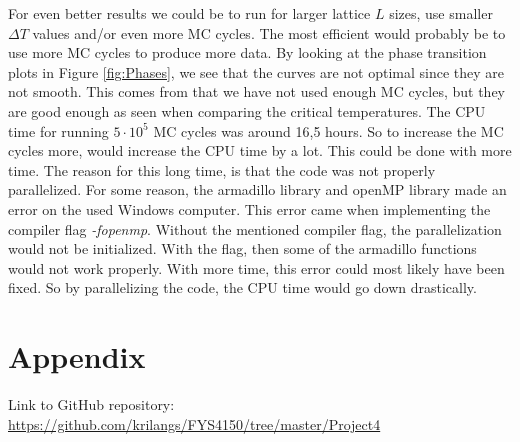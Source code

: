 \documentclass[12pt,a4paper,english]{article}
\begin{document}
For even better results we could be to run for larger lattice $L$ sizes, use smaller $\Delta T$ values and/or even more MC cycles. The most efficient would probably be to use more MC cycles to produce more data. By looking at the phase transition plots in Figure \ref{fig:Phases}, we see that the curves are not optimal since they are not smooth. This comes from that we have not used enough MC cycles, but they are good enough as seen when comparing the critical temperatures. The CPU time for running $5\cdot10^5$ MC cycles was around 16,5 hours. So to increase the MC cycles more, would increase the CPU time by a lot. This could be done with more time. The reason for this long time, is that the code was not properly parallelized. For some reason, the armadillo library and openMP library made an error on the used Windows computer. This error came when implementing the compiler flag \textit{-fopenmp}. Without the mentioned compiler flag, the parallelization would not be initialized. With the flag, then some of the armadillo functions would not work properly. With more time, this error could most likely have been fixed. So by parallelizing the code, the CPU time would go down drastically.

\appendix
\section{Appendix}
\label{sect:appendix}
Link to GitHub repository:\\
\url{https://github.com/krilangs/FYS4150/tree/master/Project4}



\end{document}
